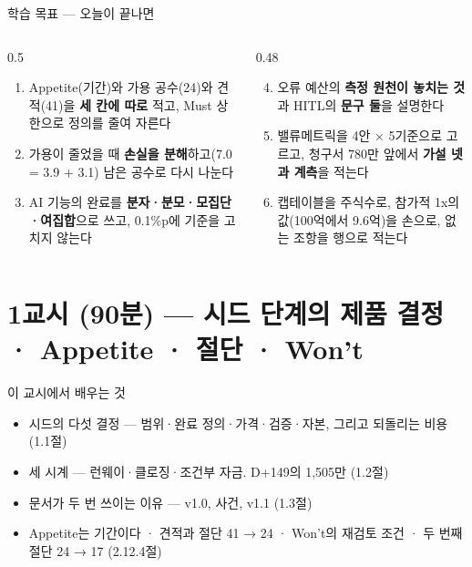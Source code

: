 \begin{frame}{학습 목표 — 오늘이 끝나면}
\begin{columns}[T]
\begin{column}{0.5\textwidth}
\begin{enumerate}
\item Appetite(기간)와 가용 공수(24)와 견적(41)을 \textbf{세 칸에 따로} 적고, Must 상한으로 정의를 줄여 자른다
\item 가용이 줄었을 때 \textbf{손실을 분해}하고(7.0 = 3.9 + 3.1) 남은 공수로 다시 나눈다
\item AI 기능의 완료를 \textbf{분자·분모·모집단·여집합}으로 쓰고, 0.1\%p에 기준을 고치지 않는다
\end{enumerate}
\end{column}
\begin{column}{0.48\textwidth}
\begin{enumerate}\setcounter{enumi}{3}
\item 오류 예산의 \textbf{측정 원천이 놓치는 것}과 HITL의 \textbf{문구 둘}을 설명한다
\item 밸류메트릭을 4안 × 5기준으로 고르고, 청구서 780만 앞에서 \textbf{가설 넷과 계측}을 적는다
\item 캡테이블을 주식수로, 참가적 1x의 값(100억에서 9.6억)을 손으로, 없는 조항을 행으로 적는다
\end{enumerate}
\end{column}
\end{columns}
\end{frame}

\section{1교시 (90분) — 시드 단계의 제품 결정 · Appetite · 절단 · Won't}
\begin{frame}{이 교시에서 배우는 것}
\begin{itemize}
\item 시드의 다섯 결정 — 범위·완료 정의·가격·검증·자본, 그리고 되돌리는 비용 (1.1절)
\item 세 시계 — 런웨이·클로징·조건부 자금. D+149의 1,505만 (1.2절)
\item 문서가 두 번 쓰이는 이유 — v1.0, 사건, v1.1 (1.3절)
\item Appetite는 기간이다 · 견적과 절단 41 → 24 · Won't의 재검토 조건 · 두 번째 절단 24 → 17 (2.1\til{}2.4절)
\end{itemize}
\end{frame}

